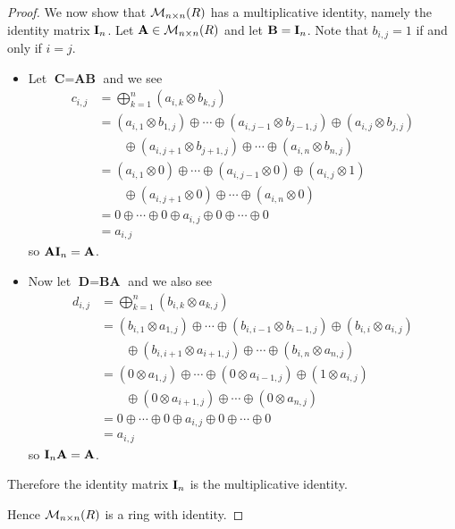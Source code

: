 \begin{proof}
    We now show that $\mathcal{M}_{n\times n}(R)$ has a multiplicative identity, namely the identity matrix $\textbf{I}_{n}$. Let $\textbf{A} \in \mathcal{M}_{n\times n}(R)$ and let $\textbf{B} = \textbf{I}_{n}$. Note that $b_{i,j} = 1$ if and only if $i = j$.
    \begin{itemize}
        \item Let $\textbf{C} = \textbf{AB}$ and we see
        \begin{align*}
            c_{i,j} &= \bigoplus_{k=1}^n(a_{i,k}\otimes b_{k,j})\\
            &= (a_{i,1}\otimes b_{1,j}) \oplus \cdots \oplus (a_{i,j-1}\otimes b_{j-1,j}) \oplus (a_{i,j}\otimes b_{j,j})\\
            &\quad\quad\oplus (a_{i,{j+1}}\otimes b_{j+1,j}) \oplus \cdots \oplus (a_{i,n}\otimes b_{n,j})\\
            &= (a_{i,1}\otimes 0) \oplus \cdots \oplus (a_{i,{j-1}}\otimes 0)\oplus (a_{i,j}\otimes 1)\\
            &\quad\quad\oplus (a_{i,{j+1}}\otimes 0) \oplus \cdots \oplus (a_{i,n}\otimes 0)\\
            &= 0 \oplus \cdots \oplus 0 \oplus a_{i,j} \oplus 0 \oplus \cdots \oplus 0\\
            &= a_{i,j}
        \end{align*}
        so $\textbf{A}\textbf{I}_{n} = \textbf{A}$.

        \item Now let $\textbf{D} = \textbf{BA}$ and we also see
        \begin{align*}
            d_{i,j} &= \bigoplus_{k=1}^n(b_{i,k}\otimes a_{k,j})\\
            &= (b_{i,1}\otimes a_{1,j}) \oplus \cdots \oplus (b_{i,i-1}\otimes b_{i-1,j}) \oplus (b_{i,i}\otimes a_{i,j})\\
            &\quad\quad\oplus (b_{i,{i+1}}\otimes a_{i+1,j}) \oplus \cdots \oplus (b_{i,n}\otimes a_{n,j})\\
            &= (0 \otimes a_{1,j}) \oplus \cdots \oplus (0\otimes a_{i-1,j})\oplus (1\otimes a_{i,j})\\
            &\quad\quad\oplus (0\otimes a_{i+1,j}) \oplus \cdots \oplus (0\otimes a_{n,j})\\
            &= 0 \oplus \cdots \oplus 0 \oplus a_{i,j} \oplus 0 \oplus \cdots \oplus 0\\
            &= a_{i,j}
        \end{align*}
        so $\textbf{I}_{n}\textbf{A} = \textbf{A}$.
    \end{itemize}
    Therefore the identity matrix $\textbf{I}_{n}$ is the multiplicative identity.

    Hence $\mathcal{M}_{n\times n}(R)$ is a ring with identity.
\end{proof}

